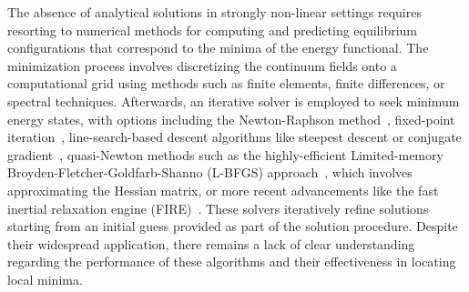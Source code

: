 The absence of analytical solutions in strongly non-linear settings requires resorting to numerical methods for computing and predicting equilibrium configurations that correspond to the minima of the energy functional. The minimization process involves discretizing the continuum fields onto a computational grid using methods such as finite elements, finite differences, or spectral techniques. Afterwards, an iterative solver is employed to seek minimum energy states, with options including the Newton-Raphson method~\cite{Wick2017-bo}, fixed-point iteration~\cite{Chen2019-mn,Kirkesaether_Brun2020-wa,Storvik2021-cd}, line-search-based descent algorithms like steepest descent or conjugate gradient~\cite{Stiefel1952-fw,Dai1999-hz}, quasi-Newton methods such as the highly-efficient Limited-memory Broyden-Fletcher-Goldfarb-Shanno (\textsc{L-BFGS}) approach~\cite{Liu1989-kl}, which involves approximating the Hessian matrix, or more recent advancements like the fast inertial relaxation engine (\textsc{FIRE})~\cite{Guenole2020-tc}. These solvers iteratively refine solutions starting from an initial guess provided as part of the solution procedure. Despite their widespread application, there remains a lack of clear understanding regarding the performance of these algorithms and their effectiveness in locating local minima. 


